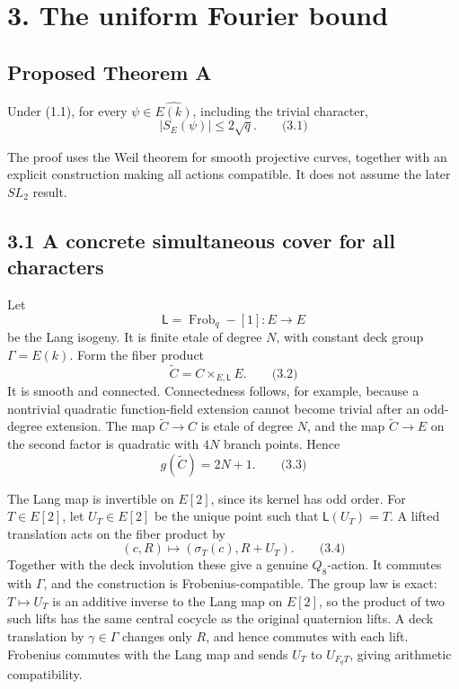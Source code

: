\documentclass[
  11pt,
  a4paper,
]{article}
\begin{document}
\section{3. The uniform Fourier bound}\label{the-uniform-fourier-bound}

\subsection{Proposed Theorem A}\label{proposed-theorem-a}

Under (1.1), for every \(\psi\in\widehat{E(k)}\), including the trivial
character, \[
\boxed{|S_E(\psi)|\le2\sqrt q.}
\qquad \text{(3.1)}
\]

The proof uses the Weil theorem for smooth projective curves, together
with an explicit construction making all actions compatible. It does not
assume the later \(SL_2\) result.

\subsection{3.1 A concrete simultaneous cover for all
characters}\label{a-concrete-simultaneous-cover-for-all-characters}

Let \[
\mathsf L=\operatorname{Frob}_q-[1]:E\to E
\] be the Lang isogeny. It is finite etale of degree \(N\), with
constant deck group \(\Gamma=E(k)\). Form the fiber product \[
\widetilde C=C\times_{E,\mathsf L}E.
\qquad \text{(3.2)}
\] It is smooth and connected. Connectedness follows, for example,
because a nontrivial quadratic function-field extension cannot become
trivial after an odd-degree extension. The map \(\widetilde C\to C\) is
etale of degree \(N\), and the map \(\widetilde C\to E\) on the second
factor is quadratic with \(4N\) branch points. Hence \[
g(\widetilde C)=2N+1.
\qquad \text{(3.3)}
\]

The Lang map is invertible on \(E[2]\), since its kernel has odd order.
For \(T\in E[2]\), let \(U_T\in E[2]\) be the unique point such that
\(\mathsf L(U_T)=T\). A lifted translation acts on the fiber product by
\[
(c,R)\longmapsto(\sigma_T(c),R+U_T).
\qquad \text{(3.4)}
\] Together with the deck involution these give a genuine
\(Q_8\)-action. It commutes with \(\Gamma\), and the construction is
Frobenius-compatible. The group law is exact: \(T\mapsto U_T\) is an
additive inverse to the Lang map on \(E[2]\), so the product of two such
lifts has the same central cocycle as the original quaternion lifts. A
deck translation by \(\gamma\in\Gamma\) changes only \(R\), and hence
commutes with each lift. Frobenius commutes with the Lang map and sends
\(U_T\) to \(U_{F_qT}\), giving arithmetic compatibility.
\end{document}
